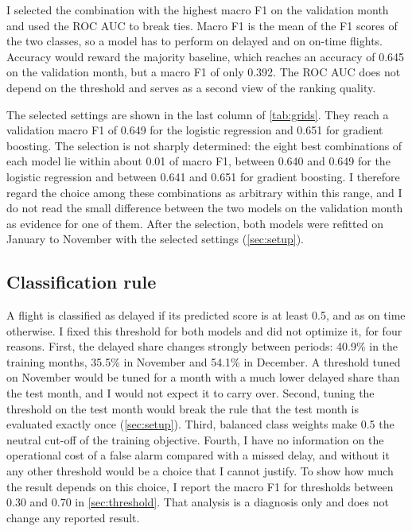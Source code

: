 I selected the combination with the highest macro F1 on the validation month and used the ROC AUC to break ties. Macro F1 is the mean of the F1 scores of the two classes, so a model has to perform on delayed and on on-time flights. Accuracy would reward the majority baseline, which reaches an accuracy of 0.645 on the validation month, but a macro F1 of only 0.392. The ROC AUC does not depend on the threshold and serves as a second view of the ranking quality.

The selected settings are shown in the last column of \cref{tab:grids}. They reach a validation macro F1 of 0.649 for the logistic regression and 0.651 for gradient boosting. The selection is not sharply determined: the eight best combinations of each model lie within about 0.01 of macro F1, between 0.640 and 0.649 for the logistic regression and between 0.641 and 0.651 for gradient boosting. I therefore regard the choice among these combinations as arbitrary within this range, and I do not read the small difference between the two models on the validation month as evidence for one of them. After the selection, both models were refitted on January to November with the selected settings (\cref{sec:setup}).

\subsection{Classification rule}\label{sec:rule}

A flight is classified as delayed if its predicted score is at least 0.5, and as on time otherwise. I fixed this threshold for both models and did not optimize it, for four reasons. First, the delayed share changes strongly between periods: 40.9\% in the training months, 35.5\% in November and 54.1\% in December. A threshold tuned on November would be tuned for a month with a much lower delayed share than the test month, and I would not expect it to carry over. Second, tuning the threshold on the test month would break the rule that the test month is evaluated exactly once (\cref{sec:setup}). Third, balanced class weights make 0.5 the neutral cut-off of the training objective. Fourth, I have no information on the operational cost of a false alarm compared with a missed delay, and without it any other threshold would be a choice that I cannot justify. To show how much the result depends on this choice, I report the macro F1 for thresholds between 0.30 and 0.70 in \cref{sec:threshold}. That analysis is a diagnosis only and does not change any reported result.

